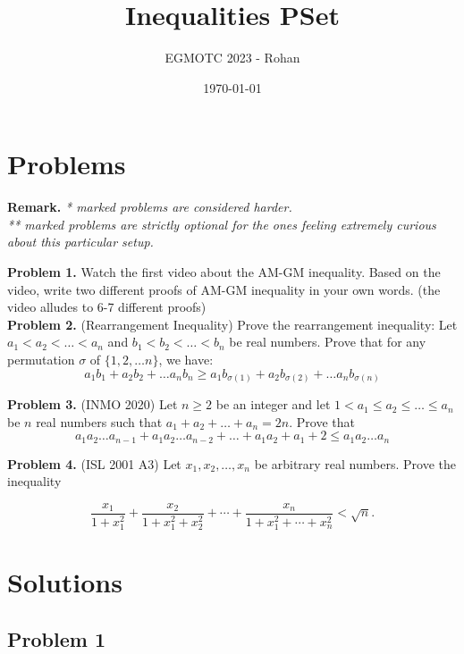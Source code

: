 \documentclass[12pt]{article}
\title{Inequalities PSet}
\author{EGMOTC 2023 - Rohan}
\date{\today}
\begin{document}
\maketitle

\newcommand{\localtextbulletone}{\textcolor{black}{\raisebox{.45ex}{\rule{.6ex}{.6ex}}}}
\renewcommand{\labelitemi}{\localtextbulletone}

\section*{Problems}
\vspace{1cm}
\thispagestyle{empty}

\textbf{Remark.} \textit{* marked problems are considered harder.\\ ** marked problems are strictly optional for the ones feeling extremely curious about this particular setup.\\}

\textbf{Problem 1.} Watch the first video about the AM-GM inequality. Based on the video, write two different proofs of AM-GM inequality in your own words. (the video alludes to 6-7 different proofs)\\

\textbf{Problem 2.} (Rearrangement Inequality) Prove the rearrangement inequality:
Let $a_1<a_2<\ldots <a_n$ and $b_1<b_2<\ldots < b_n$ be real numbers. Prove that for any permutation $\sigma$ of $\{1,2,\ldots n\}$, we have: \[a_1b_1+a_2b_2+\ldots a_nb_n \ge a_1b_{\sigma(1)}+a_2b_{\sigma(2)}+\ldots a_nb_{\sigma(n)}\]

\textbf{Problem 3.} (INMO 2020) Let $n \geqslant 2$ be an integer and let $1<a_1 \le a_2 \le \dots \le a_n$ be $n$ real numbers such that $a_1+a_2+\dots+a_n=2n$. Prove that \[a_1a_2\dots a_{n-1}+a_1a_2\dots a_{n-2}+\dots+a_1a_2+a_1+2 \leq a_1a_2\dots a_n\]

\textbf{Problem 4.} (ISL 2001 A3) Let $x_1,x_2,\ldots,x_n$ be arbitrary real numbers. Prove the inequality

\[
\frac{x_1}{1+x_1^2} + \frac{x_2}{1+x_1^2 + x_2^2} + \cdots +
\frac{x_n}{1 + x_1^2 + \cdots + x_n^2} < \sqrt{n}.
\]
\eject
\section*{Solutions}

\subsection*{Problem 1}
\end{document}
